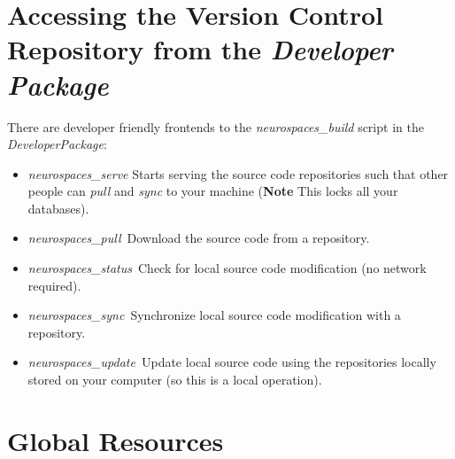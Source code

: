 \documentclass[12pt]{article}
\begin{document}
\section*{Accessing the Version Control Repository from the {\it Developer Package}}




There are developer friendly frontends to the {\it neurospaces\_build} script in the {\it DeveloperPackage}:
\begin{itemize}
\item[]{\it neurospaces\_serve} Starts serving the source code repositories such that other people can {\it pull} and {\it sync} to your machine ({\bf Note} This locks all your databases).
\item[]{\it neurospaces\_pull}\,\,\,Download the source code from a repository.
\item[]{\it neurospaces\_status}\,\,\,Check for local source code modification (no network required).
\item[]{\it neurospaces\_sync}\,\,\,Synchronize local source code modification with a repository.
\item[]{\it neurospaces\_update}\,\,\,Update local source code using the repositories locally stored on your computer (so this is a local operation). 
\end{itemize}

\section*{Global Resources}
\end{document}
